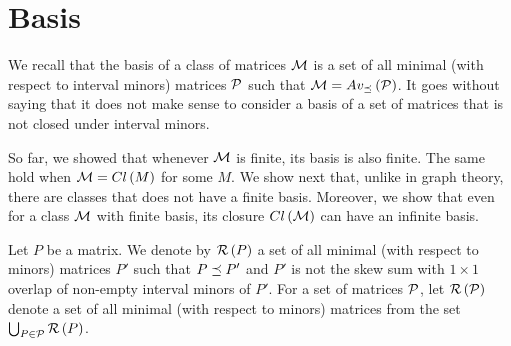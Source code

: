 \section{Basis}
We recall that the basis of a class of matrices $\mathcal{M}$ is a set of all minimal (with respect to interval minors) matrices $\mathcal{P}$ such that $\mathcal{M}=Av_{\preceq}\left(\mathcal{P}\right)$. It goes without saying that it does not make sense to consider a basis of a set of matrices that is not closed under interval minors.

So far, we showed that whenever $\mathcal{M}$ is finite, its basis is also finite. The same hold when $\mathcal{M}=Cl\left(M\right)$ for some $M$. We show next that, unlike in graph theory, there are classes that does not have a finite basis. Moreover, we show that even for a class $\mathcal{M}$ with finite basis, its closure $Cl\left(\mathcal{M}\right)$ can have an infinite basis.

\begin{defn}
Let $P$ be a matrix. We denote by $\mathcal{R}\left(P\right)$ a set of all minimal (with respect to minors) matrices $P'$ such that $P\preceq P'$ and $P'$ is not the skew sum with $1\times1$ overlap of non-empty interval minors of $P'$. For a set of matrices $\mathcal{P}$, let $\mathcal{R}\left(\mathcal{P}\right)$ denote a set of all minimal (with respect to minors) matrices from the set $\bigcup_{P\in\mathcal{P}}\mathcal{R}\left(P\right)$.
\end{defn}

